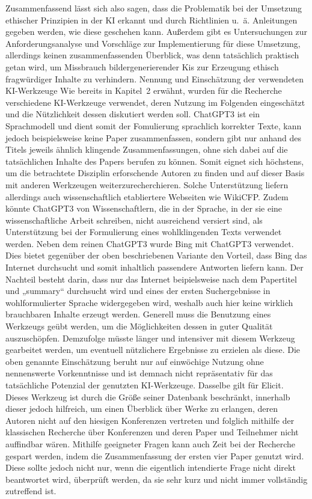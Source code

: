 \documentclass[12pt]{article}
\begin{document}
Zusammenfassend lässt sich also sagen, dass die Problematik bei der Umsetzung ethischer Prinzipien in der KI erkannt und durch Richtlinien u. ä. Anleitungen gegeben werden, wie diese geschehen kann. Außerdem gibt es Untersuchungen zur Anforderungsanalyse und Vorschläge zur Implementierung für diese Umsetzung, allerdings keinen zusammenfassenden Überblick, was denn tatsächlich praktisch getan wird, um Missbrauch bildergenerierender Kis zur Erzeugung ethisch fragwürdiger Inhalte zu verhindern.
Nennung und Einschätzung der verwendeten KI-Werkzeuge
Wie bereits in Kapitel 2 erwähnt, wurden für die Recherche verschiedene KI-Werkzeuge verwendet, deren Nutzung im Folgenden eingeschätzt und die Nützlichkeit dessen diskutiert werden soll. 
ChatGPT3 ist ein Sprachmodell und dient somit der Fomulierung sprachlich korrekter Texte, kann jedoch beispielsweise keine Paper zusammenfassen, sondern gibt nur anhand des Titels jeweils ähnlich klingende Zusammenfassungen, ohne sich dabei auf die tatsächlichen Inhalte des Papers berufen zu können. Somit eignet sich höchstens, um die betrachtete Disziplin erforschende Autoren zu finden und auf dieser Basis mit anderen Werkzeugen weiterzurecherchieren. Solche Unterstützung liefern allerdings auch wissenschaftlich etabliertere Webseiten wie WikiCFP. Zudem könnte ChatGPT3 von Wissenschaftlern, die in der Sprache, in der sie eine wissenschaftliche Arbeit schreiben, nicht ausreichend versiert sind, als Unterstützung bei der Formulierung eines wohlklingenden Texts verwendet werden.
Neben dem reinen ChatGPT3 wurde Bing mit ChatGPT3 verwendet. Dies bietet gegenüber der oben beschriebenen Variante den Vorteil, dass Bing das Internet durchsucht und somit inhaltlich passendere Antworten liefern kann. Der Nachteil besteht darin, dass nur das Internet beipielsweise nach dem Papertitel und „summary“ durchsucht wird und eines der ersten Suchergebnisse in wohlformulierter Sprache widergegeben wird, weshalb auch hier keine wirklich brauchbaren Inhalte erzeugt werden.
Generell muss die Benutzung eines Werkzeugs geübt werden, um die Möglichkeiten dessen in guter Qualität auszuschöpfen. Demzufolge müsste länger und intensiver mit diesem Werkzeug gearbeitet werden, um eventuell nützlichere Ergebnisse zu erzielen als diese. Die oben genannte Einschätzung beruht nur auf einwöchige Nutzung ohne nennenswerte Vorkenntnisse und ist demnach nicht repräsentativ für das tatsächliche Potenzial der genutzten KI-Werkzeuge.
Dasselbe gilt für Elicit. Dieses Werkzeug ist durch die Größe seiner Datenbank beschränkt, innerhalb dieser jedoch hilfreich, um einen Überblick über Werke zu erlangen, deren Autoren nicht auf den hiesigen Konferenzen vertreten und folglich mithilfe der klassischen Recherche über Konferenzen und deren Paper und Teilnehmer nicht auffindbar wären. Mithilfe geeigneter Fragen kann auch Zeit bei der Recherche gespart werden, indem die Zusammenfassung der ersten vier Paper genutzt wird. Diese sollte jedoch nicht nur, wenn die eigentlich intendierte Frage nicht direkt beantwortet wird, überprüft werden, da sie sehr kurz und nicht immer vollständig zutreffend ist.
\end{document}
